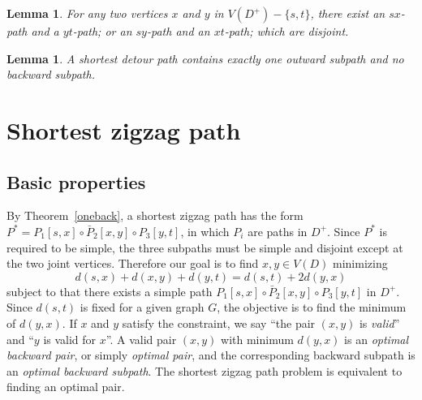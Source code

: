 \documentclass[review]{elsarticle}
\def\squarebox#1{\hbox to #1{\hfill\vbox to #1{\vfill}}}
\renewcommand{\qed}{\hspace*{\fill}
            \vbox{\hrule\hbox{\vrule\squarebox{.667em}\vrule}\hrule}\smallskip\newline}
\newtheorem{lem}[thm]{Lemma}
\begin{document}
\begin{lem}\label{2paths}
For any two vertices $x$ and $y$ in $V(D^+)-\{s,t\}$, there exist an
$sx$-path and a $yt$-path; or an $sy$-path and an $xt$-path; which
are disjoint.
\end{lem}

\begin{lem}\label{oneout}
A shortest detour path contains exactly one outward subpath and no
backward subpath.
\end{lem}

\section{Shortest zigzag path}

\subsection{Basic properties}
By Theorem~\ref{oneback}, a shortest zigzag path has the form
$P^*=P_1[s,x]\circ \bar{P}_2[x,y]\circ P_3[y,t]$, in which $P_i$ are
paths in $D^+$. Since $P^*$ is required to be simple, the three
subpaths must be simple and disjoint except at the two joint
vertices. Therefore our goal is to find $x,y\in V(D)$ minimizing
\begin{equation}
d(s,x)+d(x,y)+d(y,t)=d(s,t)+2d(y,x)
\end{equation}
subject to that there exists a simple path $P_1[s,x]\circ
\bar{P}_2[x,y]\circ P_3[y,t]$ in $D^+$. Since $d(s,t)$ is fixed for
a given graph $G$, the objective is to find the minimum of $d(y,x)$.
If $x$ and $y$ satisfy the constraint, we say ``the pair $(x,y)$ is
{\em valid}'' and ``$y$ is valid for $x$''. A valid pair $(x,y)$
with minimum $d(y,x)$ is an \emph{optimal backward pair}, or simply
{\em optimal pair}, and the corresponding backward subpath is an
{\em optimal backward subpath}. The shortest zigzag path problem is
equivalent to finding an optimal pair.
\end{document}
